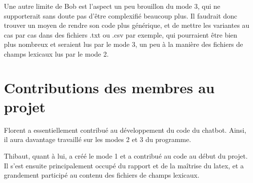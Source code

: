 \documentclass[paper=a4, 12pt]{report}
\begin{document}
Une autre limite de Bob est l’aspect un peu brouillon du mode 3, qui ne supporterait sans doute pas d’être complexifié beaucoup plus. Il faudrait donc trouver un moyen de rendre son code plus générique, et de mettre les variantes au cas par cas dans des fichiers .txt ou .csv par exemple, qui pourraient être bien plus nombreux et seraient lus par le mode 3, un peu à la manière des fichiers de champs lexicaux lus par le mode 2.

\section{Contributions des membres au projet}
\vspace{0.5cm}
Florent a essentiellement contribué au développement du code du chatbot. Ainsi, il aura davantage travaillé sur les modes 2 et 3 du programme.

\vspace{0.5cm}

Thibaut, quant à lui, a créé le mode 1 et a contribué au code au début du projet.
Il s’est ensuite principalement occupé du rapport et de la maîtrise du latex, et a grandement participé au contenu des fichiers de champs lexicaux.
\end{document}
